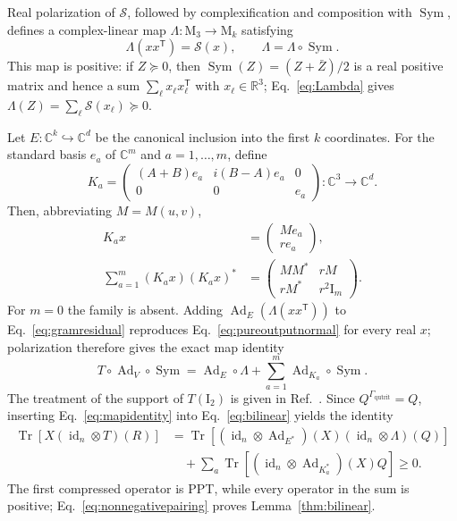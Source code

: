 \documentclass[aps,prl,reprint,superscriptaddress,nofootinbib]{revtex4-2}
\newcommand{\M}{\mathrm{M}}
\newcommand{\I}{\mathrm{I}}
\newcommand{\C}{\mathbb C}
\newcommand{\id}{\operatorname{id}}
\newcommand{\Ad}{\operatorname{Ad}}
\newcommand{\Tr}{\operatorname{Tr}}
\newcommand{\Sym}{\operatorname{Sym}}
\newcommand{\cS}{\mathcal S}
\begin{document}
Real polarization of $\cS$, followed by complexification and composition
with $\Sym$, defines a complex-linear map $\Lambda:\M_3\to\M_k$ satisfying
\begin{equation}
 \Lambda(xx^{\mathsf T})=\cS(x),\qquad
 \Lambda=\Lambda\circ\Sym.
\label{eq:Lambda}
\end{equation}
This map is positive: if $Z\succeq0$, then
$\Sym(Z)=(Z+\bar Z)/2$ is a real positive matrix and hence a sum
$\sum_\ell x_\ell x_\ell^{\mathsf T}$ with $x_\ell\in\mathbb R^3$;
Eq.~\eqref{eq:Lambda} gives
$\Lambda(Z)=\sum_\ell\cS(x_\ell)\succeq0$.

Let $E:\C^k\hookrightarrow\C^d$ be the canonical inclusion into the first
$k$ coordinates.  For
the standard basis $e_a$ of $\C^m$ and $a=1,\ldots,m$, define
\begin{equation}
 K_a=\begin{pmatrix}
  (A+B)e_a&i(B-A)e_a&0\\
  0&0&e_a
 \end{pmatrix}:\C^3\to\C^d.
\label{eq:Ka}
\end{equation}
Then, abbreviating $M=M(u,v)$,
\begin{align}
 K_ax&=\begin{pmatrix}Me_a\\re_a\end{pmatrix},
\nonumber\\[-1mm]
 \sum_{a=1}^m(K_ax)(K_ax)^*
 &=\begin{pmatrix}MM^*&rM\\rM^*&r^2\I_m\end{pmatrix}.
\label{eq:gramresidual}
\end{align}
For $m=0$ the family is absent.  Adding
$\Ad_E(\Lambda(xx^{\mathsf T}))$ to Eq.~\eqref{eq:gramresidual} reproduces
Eq.~\eqref{eq:pureoutputnormal} for every real $x$; polarization therefore
gives the exact map identity
\begin{equation}
 T\circ\Ad_V\circ\Sym
 =\Ad_E\circ\Lambda+
  \sum_{a=1}^{m}\Ad_{K_a}\circ\Sym.
\label{eq:mapidentity}
\end{equation}
The treatment of the support of $T(\I_2)$ is given in
Ref.~\cite{Supplement}.
Since
$Q^{\Gamma_{\mathrm{qutrit}}}=Q$, inserting Eq.~\eqref{eq:mapidentity} into
Eq.~\eqref{eq:bilinear} yields the identity
\begin{equation}
\begin{aligned}
 \Tr\!\left[X(\id_n\otimes T)(R)\right]
 &=\Tr\!\left[(\id_n\otimes\Ad_{E^*})(X)
        (\id_n\otimes\Lambda)(Q)\right]
 \\[-1mm]
 &\quad+\sum_a\Tr\!\left[(\id_n\otimes\Ad_{K_a^*})(X)Q\right]\geq0.
\end{aligned}
\label{eq:split}
\end{equation}
The first compressed operator is PPT, while every operator in the sum is
positive; Eq.~\eqref{eq:nonnegativepairing} proves Lemma~\ref{thm:bilinear}.
\end{document}
